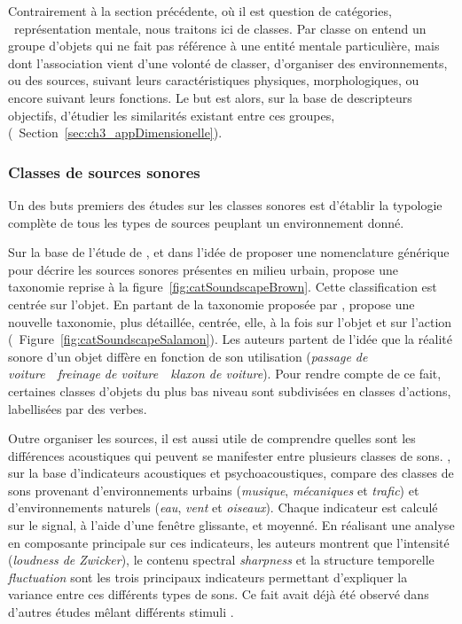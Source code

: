 Contrairement à la section précédente, où il est question de catégories, \ie~représentation mentale, nous traitons ici de classes. Par classe on entend un groupe d'objets qui ne fait pas référence à une entité mentale particulière, mais dont l'association vient d'une volonté de classer, d'organiser des environnements, ou des sources, suivant leurs caractéristiques physiques, morphologiques, ou encore suivant leurs fonctions. Le but est alors, sur la base de descripteurs objectifs, d'étudier les similarités existant entre ces groupes, (\cf~Section~\ref{sec:ch3_appDimensionelle}).


\subsubsection{Classes de sources sonores}

Un des buts premiers des études sur les classes sonores est d'établir la typologie complète de tous les types de sources peuplant un environnement donné.

Sur la base de l'étude de \citep{raimbault2005urban}, et dans l'idée de proposer une nomenclature générique pour décrire les sources sonores présentes en milieu urbain, \citep{brown2011towards} propose une taxonomie reprise à la figure~\ref{fig:catSoundscapeBrown}. Cette classification est centrée sur l'objet. En partant de la taxonomie proposée par \citep{brown2011towards}, \citep{Salamon14} propose une nouvelle taxonomie, plus détaillée, centrée, elle, à la fois sur l'objet et sur l'action (\cf~Figure~\ref{fig:catSoundscapeSalamon}). Les auteurs partent de l'idée que la réalité sonore d'un objet diffère en fonction de son utilisation (\emph{passage de voiture}~\vs~\emph{freinage de voiture}~\vs~\emph{klaxon de voiture}). Pour rendre compte de ce fait,  certaines classes d'objets du plus bas niveau sont subdivisées en classes d'actions, labellisées par des verbes.

Outre organiser les sources, il est aussi utile de comprendre quelles sont les différences acoustiques qui peuvent se manifester entre plusieurs classes de sons. \citep{yang2013psychoacoustical}, sur la base d'indicateurs acoustiques et psychoacoustiques, compare des classes de sons provenant d'environnements urbains (\emph{musique}, \emph{mécaniques} et \emph{trafic}) et d'environnements naturels (\emph{eau}, \emph{vent} et \emph{oiseaux}). Chaque indicateur est calculé sur le signal, à l'aide d'une fenêtre glissante, et moyenné. En réalisant une analyse en composante principale sur ces indicateurs, les auteurs montrent que l'intensité (\emph{loudness  de Zwicker}), le contenu spectral \emph{sharpness} et la structure temporelle \emph{fluctuation} sont les trois principaux indicateurs permettant d'expliquer la variance entre ces différents types de sons. Ce fait avait déjà été observé dans d'autres études mêlant différents stimuli \citep{de2006quiet,botteldooren2006temporal}.


